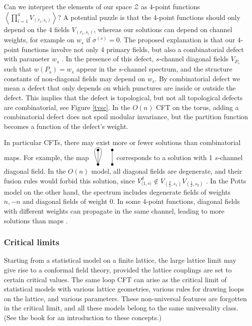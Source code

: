 \documentclass[12pt, a4paper]{article}
\newcommand{\vertices}{
\coordinate (base) at (0, 1);
\draw (0, 0) node[fill, circle, minimum size = 1.3mm, inner sep = 0]{};
  \draw (3, 0) node[fill, circle, minimum size = 1.3mm, inner sep = 0]{};
  \draw (0, 3) node[fill, circle, minimum size = 1.3mm, inner sep = 0]{};
  \draw (3, 3) node[fill, circle, minimum size = 1.3mm, inner sep = 0]{};
}
\begin{document}
Can we interpret the elements of our space $\mathcal{Z}$ as $4$-point functions $\left<\prod_{i=1}^4 V_{(r_i,s_i)}\right>$? A potential puzzle is that the 4-point functions should only depend on the 4 fields $V_{(r_i,s_i)}$, whereas our solutions can depend on channel weights, for example on $w_s$ if $\sigma^{(s)}=0$. The proposed explanation is that our $4$-point functions involve not only 4 primary fields, but also a combinatorial defect with parameter $w_s$ \cite{rib22}. In the presence of this defect, $s$-channel diagonal fields $V_{P_s}$ such that $w(P_s)=w_s$ appear in the $s$-channel spectrum, and the structure constants of non-diagonal fields may depend on $w_s$. By combinatorial defect we mean a defect that only depends on which punctures are inside or outside the defect. This implies that the defect is topological, but not all topological defects are combinatorial, see Figure \eqref{tvsc}. In the $O(n)$ CFT on the torus, adding a combinatorial defect does not spoil modular invariance, but the partition function becomes a function of the defect's weight.

In particular CFTs, there may exist more or fewer solutions than combinatorial maps. 
For example, the map 
$
\begin{tikzpicture}[baseline=(base), scale = .25]
 \vertices
  \draw (0, 0) -- (0, 3);
  \draw (3, 0) -- (3, 3);
  \draw (0, 0) to [out = 70, in = 0] (0, 3.5) to [out = 180, in = 110] (0, 0);
 \end{tikzpicture}
 $
corresponds to a solution with 1 $s$-channel diagonal field.
 In the $O(n)$ model, all diagonal fields are degenerate, and their fusion rules would forbid this solution, since $V^d_{\langle 1,s\rangle}\notin V_{(\frac32,s_1)}V_{(\frac12,s_2)}$ \cite{gnjrs21}. In the Potts model on the other hand, the spectrum includes degenerate fields of weights $n,-n$ and diagonal fields of weight $0$. In some 4-point functions, diagonal fields with different weights can propagate in the same channel, leading to more solutions than maps \cite{niv22}. 
 
\subsubsection{Critical limits}

Starting from a statistical model on a finite lattice, the large lattice limit may give rise to a conformal field theory, provided the lattice couplings are set to certain critical values. The same loop CFT can arise as the critical limit of statistical models with various lattice geometries, various rules for drawing loops on the lattice, and various parameters. These non-universal features are forgotten in the critical limit, and all these models belong to the same universality class. (See the book \cite{car96} for an introduction to these concepts.)
\end{document}
